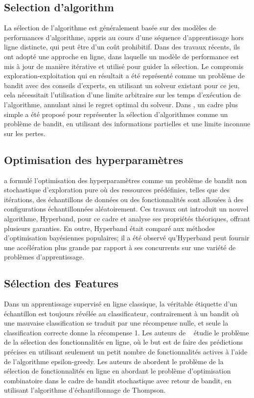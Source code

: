 \documentclass[conference]{IEEEtran}
\newcommand{\1}[1]{\mathbbm{1}_{\left\{#1\right\}}}
\begin{document}
\subsection{Selection d'algorithm }
La sélection de l'algorithme est généralement basée sur des modèles de performances d'algorithme, appris au cours d'une séquence d'apprentissage hors ligne distincte, qui peut être d'un coût prohibitif. Dans des travaux récents, ils ont adopté une approche en ligne, dans laquelle un modèle de performance est mis à jour de manière itérative et utilisé pour guider la sélection. Le compromis exploration-exploitation qui en résultait a été représenté comme un problème de bandit avec des conseils d'experts, en utilisant un solveur existant pour ce jeu, cela nécessitait l'utilisation d'une limite arbitraire sur les temps d'exécution de l'algorithme, annulant ainsi le regret optimal du solveur. Dans \cite{GaglioloS10}, un cadre plus simple a été proposé pour représenter la sélection d'algorithmes comme un problème de bandit, en utilisant des informations partielles et une limite inconnue sur les pertes.

\subsection{Optimisation des hyperparamètres}
\cite{li2016hyperband} a formulé l'optimisation des hyperparamètres comme un problème de bandit non stochastique d'exploration pure où des ressources prédéfinies, telles que des itérations, des échantillons de données ou des fonctionnalités sont allouées à des configurations échantillonnées aléatoirement. Ces travaux ont introduit un nouvel algorithme, Hyperband, pour ce cadre et analyse ses propriétés théoriques, offrant plusieurs garanties. En outre, Hyperband était comparé aux méthodes d'optimisation bayésiennes populaires; il a été observé qu'Hyperband peut fournir une accélération plus grande par rapport à ses concurrents sur une variété de problèmes d'apprentissage.

\subsection{Sélection des Features}
Dans un apprentissage supervisé en ligne classique, la véritable étiquette d'un échantillon est toujours révélée au classificateur, contrairement à un bandit où une mauvaise classification se traduit par une récompense nulle, et seule la classification correcte donne la récompense 1. Les auteurs de ~ \cite{wang2014online} étudie le problème de la sélection des fonctionnalités en ligne, où le but est de faire des prédictions précises en utilisant seulement un petit nombre de fonctionnalités actives à l'aide de l'algorithme epsilon-greedy. Les auteurs de \cite{BouneffoufRCF17} abordent le problème de la sélection de fonctionnalités en ligne en abordant le problème d'optimisation combinatoire dans le cadre de bandit stochastique avec retour de bandit, en utilisant l'algorithme d'échantillonnage de Thompson. 
\end{document}
